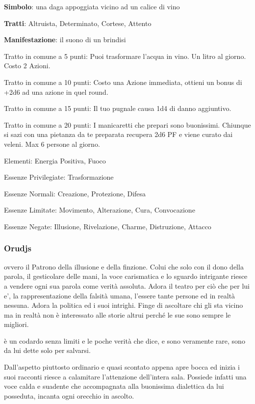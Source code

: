 \documentclass[a4paper,11pt,twoside,openany]{book}
\begin{document}
\textbf{Simbolo}: una daga appoggiata vicino ad un calice di vino

\textbf{Tratti}: Altruista, Determinato, Cortese, Attento

\textbf{Manifestazione}: il suono di un brindisi

\bigskip

Tratto in comune a 5 punti: Puoi trasformare l'acqua in vino. Un litro al giorno. Costo 2 Azioni.

Tratto in comune a 10 punti: Costo una Azione immediata, ottieni un bonus di +2d6 ad una azione in quel round.

Tratto in comune a 15 punti: Il tuo pugnale causa 1d4 di danno aggiuntivo.

Tratto in comune a 20 punti: I manicaretti che prepari sono buonissimi. Chiunque si sazi con una pietanza da te preparata recupera 2d6 PF e viene curato dai veleni. Max 6 persone al giorno.

\bigskip

Elementi: Energia Positiva, Fuoco

\bigskip

Essenze Privilegiate: Trasformazione

Essenze Normali: Creazione, Protezione, Difesa

Essenze Limitate: Movimento, Alterazione, Cura, Convocazione

Essenze Negate: Illusione, Rivelazione, Charme, Distruzione, Attacco

\subsubsection{Orudjs}

\label{orudjs}

ovvero il Patrono della illusione e della finzione. Colui che solo con il dono della parola, il gesticolare delle mani, la voce carismatica e lo sguardo intrigante riesce a vendere ogni sua parola come verità assoluta. Adora il teatro per ciò che per lui e', la rappresentazione della falsità umana, l'essere tante persone ed in realtà nessuna. Adora la politica ed i suoi intrighi. Finge di ascoltare chi gli sta vicino ma in realtà non è interessato alle storie altrui perché le sue sono sempre le migliori.

è un codardo senza limiti e le poche verità che dice, e sono veramente rare, sono da lui dette solo per salvarsi.

Dall'aspetto piuttosto ordinario e quasi scontato appena apre bocca ed inizia i suoi racconti riesce a calamitare l'attenzione dell'intera sala. Possiede infatti una voce calda e suadente che accompagnata alla buonissima dialettica da lui posseduta, incanta ogni orecchio in ascolto.
\end{document}

